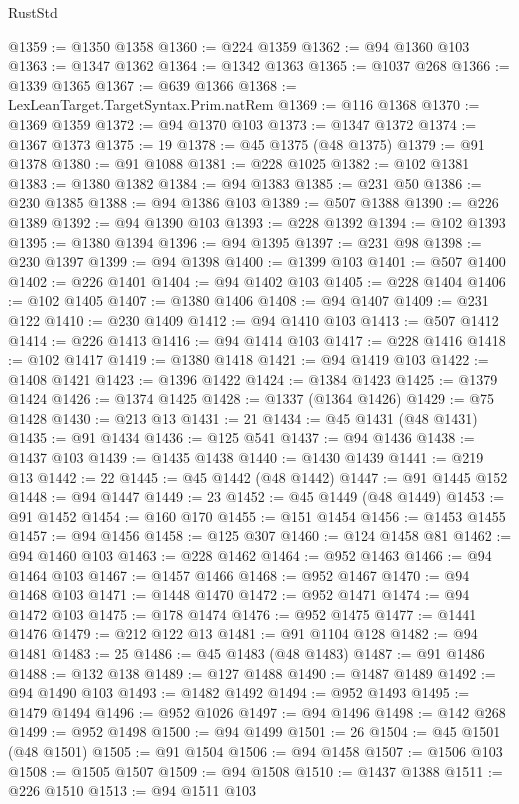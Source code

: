\begin{lexlean}{RustStd}
\begin{coremodule}
@1359 := @1350 @1358
@1360 := @224 @1359
@1362 := @94 @1360 @103
@1363 := @1347 @1362
@1364 := @1342 @1363
@1365 := @1037 @268
@1366 := @1339 @1365
@1367 := @639 @1366
@1368 := LexLeanTarget.TargetSyntax.Prim.natRem
@1369 := @116 @1368
@1370 := @1369 @1359
@1372 := @94 @1370 @103
@1373 := @1347 @1372
@1374 := @1367 @1373
@1375 := 19
@1378 := @45 @1375 (@48 @1375)
@1379 := @91 @1378
@1380 := @91 @1088
@1381 := @228 @1025
@1382 := @102 @1381
@1383 := @1380 @1382
@1384 := @94 @1383
@1385 := @231 @50
@1386 := @230 @1385
@1388 := @94 @1386 @103
@1389 := @507 @1388
@1390 := @226 @1389
@1392 := @94 @1390 @103
@1393 := @228 @1392
@1394 := @102 @1393
@1395 := @1380 @1394
@1396 := @94 @1395
@1397 := @231 @98
@1398 := @230 @1397
@1399 := @94 @1398
@1400 := @1399 @103
@1401 := @507 @1400
@1402 := @226 @1401
@1404 := @94 @1402 @103
@1405 := @228 @1404
@1406 := @102 @1405
@1407 := @1380 @1406
@1408 := @94 @1407
@1409 := @231 @122
@1410 := @230 @1409
@1412 := @94 @1410 @103
@1413 := @507 @1412
@1414 := @226 @1413
@1416 := @94 @1414 @103
@1417 := @228 @1416
@1418 := @102 @1417
@1419 := @1380 @1418
@1421 := @94 @1419 @103
@1422 := @1408 @1421
@1423 := @1396 @1422
@1424 := @1384 @1423
@1425 := @1379 @1424
@1426 := @1374 @1425
@1428 := @1337 (@1364 @1426)
@1429 := @75 @1428
@1430 := @213 @13
@1431 := 21
@1434 := @45 @1431 (@48 @1431)
@1435 := @91 @1434
@1436 := @125 @541
@1437 := @94 @1436
@1438 := @1437 @103
@1439 := @1435 @1438
@1440 := @1430 @1439
@1441 := @219 @13
@1442 := 22
@1445 := @45 @1442 (@48 @1442)
@1447 := @91 @1445 @152
@1448 := @94 @1447
@1449 := 23
@1452 := @45 @1449 (@48 @1449)
@1453 := @91 @1452
@1454 := @160 @170
@1455 := @151 @1454
@1456 := @1453 @1455
@1457 := @94 @1456
@1458 := @125 @307
@1460 := @124 @1458 @81
@1462 := @94 @1460 @103
@1463 := @228 @1462
@1464 := @952 @1463
@1466 := @94 @1464 @103
@1467 := @1457 @1466
@1468 := @952 @1467
@1470 := @94 @1468 @103
@1471 := @1448 @1470
@1472 := @952 @1471
@1474 := @94 @1472 @103
@1475 := @178 @1474
@1476 := @952 @1475
@1477 := @1441 @1476
@1479 := @212 @122 @13
@1481 := @91 @1104 @128
@1482 := @94 @1481
@1483 := 25
@1486 := @45 @1483 (@48 @1483)
@1487 := @91 @1486
@1488 := @132 @138
@1489 := @127 @1488
@1490 := @1487 @1489
@1492 := @94 @1490 @103
@1493 := @1482 @1492
@1494 := @952 @1493
@1495 := @1479 @1494
@1496 := @952 @1026
@1497 := @94 @1496
@1498 := @142 @268
@1499 := @952 @1498
@1500 := @94 @1499
@1501 := 26
@1504 := @45 @1501 (@48 @1501)
@1505 := @91 @1504
@1506 := @94 @1458
@1507 := @1506 @103
@1508 := @1505 @1507
@1509 := @94 @1508
@1510 := @1437 @1388
@1511 := @226 @1510
@1513 := @94 @1511 @103

\end{coremodule}
\end{lexlean}
